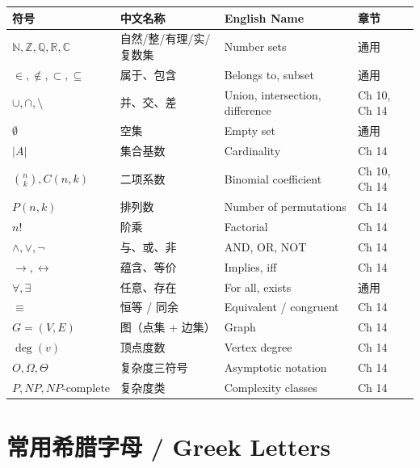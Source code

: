 \begin{center}
\renewcommand{\arraystretch}{1.25}
\begin{tabular}{@{}llll@{}}
\toprule
\textbf{符号} & \textbf{中文名称} & \textbf{English Name} & \textbf{章节} \\
\midrule
$\mathbb{N}, \mathbb{Z}, \mathbb{Q}, \mathbb{R}, \mathbb{C}$ & 自然/整/有理/实/复数集 & Number sets & 通用 \\
$\in, \notin, \subset, \subseteq$ & 属于、包含 & Belongs to, subset & 通用 \\
$\cup, \cap, \setminus$ & 并、交、差 & Union, intersection, difference & Ch 10, Ch 14 \\
$\emptyset$ & 空集 & Empty set & 通用 \\
$|A|$ & 集合基数 & Cardinality & Ch 14 \\
$\binom{n}{k}, C(n,k)$ & 二项系数 & Binomial coefficient & Ch 10, Ch 14 \\
$P(n,k)$ & 排列数 & Number of permutations & Ch 14 \\
$n!$ & 阶乘 & Factorial & Ch 14 \\
$\land, \lor, \neg$ & 与、或、非 & AND, OR, NOT & Ch 14 \\
$\to, \leftrightarrow$ & 蕴含、等价 & Implies, iff & Ch 14 \\
$\forall, \exists$ & 任意、存在 & For all, exists & 通用 \\
$\equiv$ & 恒等 / 同余 & Equivalent / congruent & Ch 14 \\
$G = (V, E)$ & 图（点集 + 边集） & Graph & Ch 14 \\
$\deg(v)$ & 顶点度数 & Vertex degree & Ch 14 \\
$O, \Omega, \Theta$ & 复杂度三符号 & Asymptotic notation & Ch 14 \\
$P, NP, NP\text{-complete}$ & 复杂度类 & Complexity classes & Ch 14 \\
\bottomrule
\end{tabular}
\end{center}

\section{常用希腊字母 / Greek Letters}

